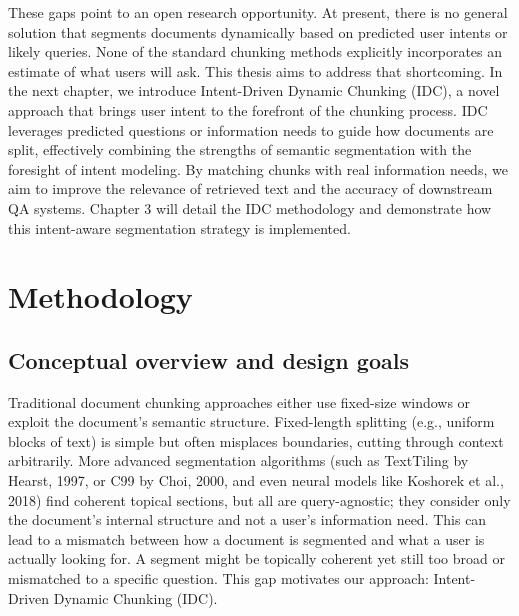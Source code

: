 \documentclass[12pt,a4paper]{report}
\begin{document}
These gaps point to an open research opportunity. At present, there is no general solution that segments documents dynamically based on predicted user intents or likely queries. None of the standard chunking methods explicitly incorporates an estimate of what users will ask. This thesis aims to address that shortcoming. In the next chapter, we introduce Intent-Driven Dynamic Chunking (IDC), a novel approach that brings user intent to the forefront of the chunking process. IDC leverages predicted questions or information needs to guide how documents are split, effectively combining the strengths of semantic segmentation with the foresight of intent modeling. By matching chunks with real information needs, we aim to improve the relevance of retrieved text and the accuracy of downstream QA systems. Chapter 3 will detail the IDC methodology and demonstrate how this intent-aware segmentation strategy is implemented.

\chapter{Methodology}

\section{Conceptual overview and design goals}

Traditional document chunking approaches either use fixed-size windows or exploit the document's semantic structure. Fixed-length splitting (e.g., uniform blocks of text) is simple but often misplaces boundaries, cutting through context arbitrarily. More advanced segmentation algorithms (such as TextTiling by Hearst, 1997, or C99 by Choi, 2000, and even neural models like Koshorek et al., 2018) find coherent topical sections, but all are query-agnostic; they consider only the document's internal structure and not a user's information need. This can lead to a mismatch between how a document is segmented and what a user is actually looking for. A segment might be topically coherent yet still too broad or mismatched to a specific question. This gap motivates our approach: Intent-Driven Dynamic Chunking (IDC).
\end{document}
